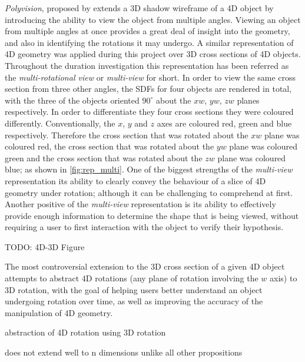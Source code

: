 \documentclass{l4proj}
\begin{document}
\pagebreak
\textit{Polyvision}, proposed by \citet{matsumoto_polyvision_2019} extends a 3D shadow wireframe of a 4D object by introducing the ability to view the object from multiple angles. Viewing an object from multiple angles at once provides a great deal of insight into the geometry, and also in identifying the rotations it may undergo.
A similar representation of 4D geometry was applied during this project over 3D cross sections of 4D objects. Throughout the duration investigation this representation has been referred as the \textit{multi-rotational view} or \textit{multi-view} for short.
In order to view the same cross section from three other angles, the SDFs for four objects are rendered in total, with the three of the objects oriented $90^{\circ}$ about the $xw$, $yw$, $zw$ planes respectively. 
In order to differentiate they four cross sections they were coloured differently. Conventionally, the \(x\), \(y\) and \(z\) axes are coloured red, green and blue respectively. Therefore the cross section that was rotated about the $xw$ plane was coloured red, the cross section that was rotated about the $yw$ plane was coloured green and the cross section that was rotated about the $zw$ plane was coloured blue; as shown in \cref{fig:rep_multi}.
One of the biggest strengths of the \textit{multi-view} representation its ability to clearly convey the behaviour of a slice of 4D geometry under rotation; although it can be challenging to comprehend at first.
Another positive of the \textit{multi-view} representation is its ability to effectively provide enough information to determine the shape that is being viewed, without requiring a user to first interaction with the object to verify their hypothesis.

TODO: 4D-3D Figure
\label{fig:rep_4-to-3}

The most controversial extension to the 3D cross section of a given 4D object attempts to abstract 4D rotations (any plane of rotation involving the \(w\) axis) to 3D rotation, with the goal of helping users better understand an object undergoing rotation over time, as well as improving the accuracy of the manipulation of 4D geometry.


abstraction of 4D rotation using 3D rotation

does not extend well to n dimensions unlike all other propositions
\end{document}
